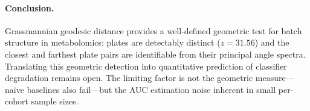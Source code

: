 \documentclass{article}
\begin{document}
\paragraph{Conclusion.} Grassmannian geodesic distance provides a well-defined geometric test for batch structure in metabolomics: plates are detectably distinct ($z = 31.56$) and the closest and farthest plate pairs are identifiable from their principal angle spectra. Translating this geometric detection into quantitative prediction of classifier degradation remains open. The limiting factor is not the geometric measure---na\"{i}ve baselines also fail---but the AUC estimation noise inherent in small per-cohort sample sizes.



\end{document}
